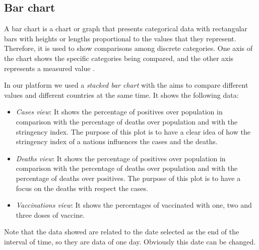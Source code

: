 \documentclass[10pt,conference]{IEEEtran}
\begin{document}
\begin{figure}
\end{figure}

\subsection{Bar chart}
A bar chart is a chart or graph that presents categorical data with rectangular bars with heights or lengths proportional 
to the values that they represent. Therefore, it is used to show comparisons among discrete categories. One axis of the chart 
shows the specific categories being compared, and the other axis represents a measured value \cite{barchart}.

In our platform we used a {\em stacked bar chart} with the aims to compare different values and different countries at the same time. 
It shows the following data:
\begin{itemize}
	\item {\em Cases view}: It shows the percentage of positives over population in comparison with the percentage of deaths over population and with the stringency index. The purpose of this plot is to have a clear idea of how the stringency index of a nations influences the cases and the deaths.
	\item {\em Deaths view}: It shows the percentage of positives over population in comparison with the percentage of deaths over population and with the percentage of deaths over positives. The purpose of this plot is to have a focus on the deaths with respect the cases.
	\item {\em Vaccinations view}: It shows the percentages of vaccinated with one, two and three doses of vaccine.
\end{itemize}

Note that the data showed are related to the date selected as the end of the interval of time, so they are data of one day. Obviously this date can be changed.
\end{document}
